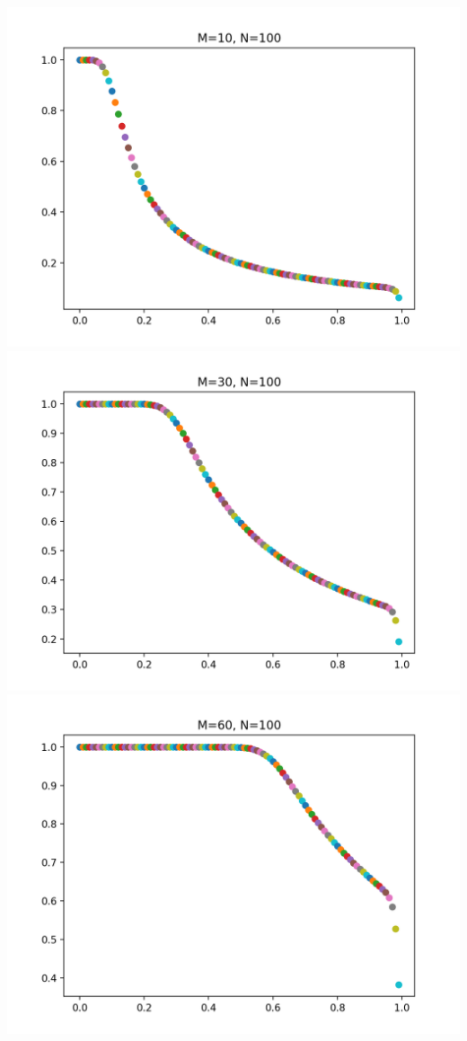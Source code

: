 \includegraphics[scale=0.5]{img/100_10}
\includegraphics[scale=0.5]{img/100_30}
\includegraphics[scale=0.5]{img/100_60}

